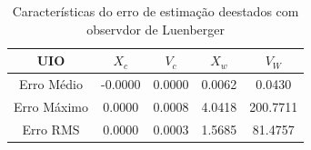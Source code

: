 \begin{table}[h!]
\footnotesize
\centering
    \begin{tabular}{|c|c|c|c|c|}
        \hline
        UIO & $X_c$& $V_c$& $X_w$& $V_W$\\
        \hline
        \hline
         Erro Médio& -0.0000& 0.0000& 0.0062&   0.0430\\ 
         Erro Máximo& 0.0000& 0.0008& 4.0418& 200.7711\\ 
         Erro RMS&    0.0000& 0.0003& 1.5685&  81.4757\\
        \hline
    \end{tabular} \label{tb:comparacao_erro_estados}\caption{Características do erro de estimação deestados com observdor de Luenberger}
\end{table}

 